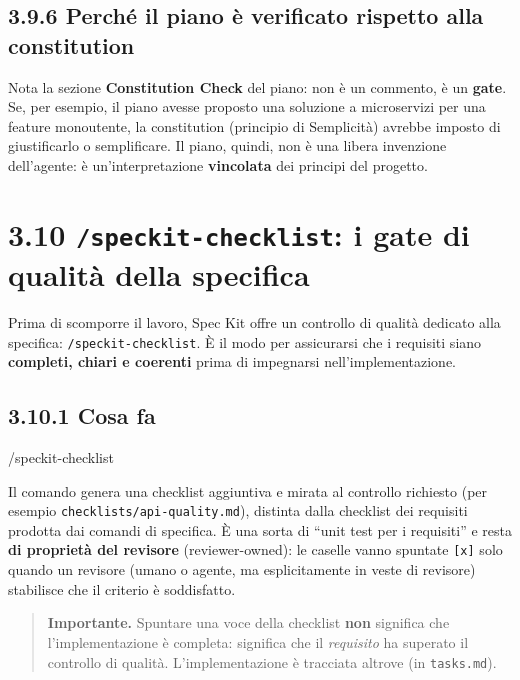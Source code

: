 \documentclass[
  italian,
  10pt,
]{book}
\newenvironment{Shaded}{\begin{snugshade}}{\end{snugshade}}
\newcommand{\NormalTok}[1]{#1}
\begin{document}
\subsection{3.9.6 Perché il piano è verificato rispetto alla
constitution}\label{perchuxe9-il-piano-uxe8-verificato-rispetto-alla-constitution}

Nota la sezione \textbf{Constitution Check} del piano: non è un
commento, è un \textbf{gate}. Se, per esempio, il piano avesse proposto
una soluzione a microservizi per una feature monoutente, la constitution
(principio di Semplicità) avrebbe imposto di giustificarlo o
semplificare. Il piano, quindi, non è una libera invenzione dell'agente:
è un'interpretazione \textbf{vincolata} dei principi del progetto.

\section{\texorpdfstring{3.10 \texttt{/speckit-checklist}: i gate di
qualità della
specifica}{3.10 /speckit-checklist: i gate di qualità della specifica}}\label{speckit-checklist-i-gate-di-qualituxe0-della-specifica}

Prima di scomporre il lavoro, Spec Kit offre un controllo di qualità
dedicato alla specifica: \texttt{/speckit-checklist}. È il modo per
assicurarsi che i requisiti siano \textbf{completi, chiari e coerenti}
prima di impegnarsi nell'implementazione.

\subsection{3.10.1 Cosa fa}\label{cosa-fa-1}

\begin{Shaded}
\begin{Highlighting}[]
\NormalTok{/speckit{-}checklist}
\end{Highlighting}
\end{Shaded}

Il comando genera una checklist aggiuntiva e mirata al controllo
richiesto (per esempio \texttt{checklists/api-quality.md}), distinta
dalla checklist dei requisiti prodotta dai comandi di specifica. È una
sorta di ``unit test per i requisiti'' e resta \textbf{di proprietà del
revisore} (reviewer-owned): le caselle vanno spuntate \texttt{{[}x{]}}
solo quando un revisore (umano o agente, ma esplicitamente in veste di
revisore) stabilisce che il criterio è soddisfatto.

\begin{quote}
\textbf{Importante.} Spuntare una voce della checklist \textbf{non}
significa che l'implementazione è completa: significa che il
\emph{requisito} ha superato il controllo di qualità. L'implementazione
è tracciata altrove (in \texttt{tasks.md}).
\end{quote}
\end{document}
